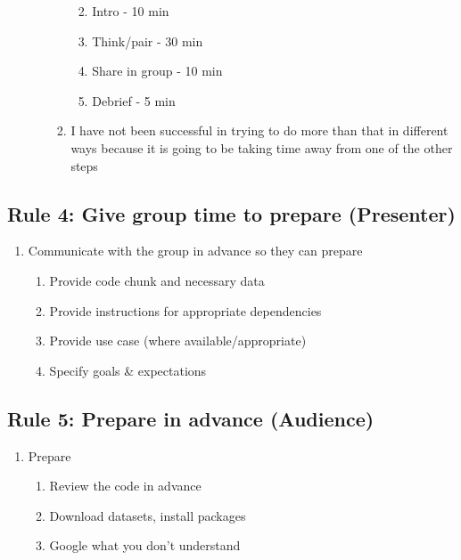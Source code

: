 \documentclass[
  11pt,
]{article}
\providecommand{\tightlist}{%
  \setlength{\itemsep}{0pt}\setlength{\parskip}{0pt}}
\begin{document}
\begin{enumerate}
\begin{enumerate}
\begin{enumerate}
      \begin{enumerate}
      \def\labelenumiv{\arabic{enumiv}.}
      \tightlist
      \item
        Intro - 10 min
      \item
        Think/pair - 30 min
      \item
        Share in group - 10 min
      \item
        Debrief - 5 min
      \end{enumerate}
    \item
      I have not been successful in trying to do more than that in
      different ways because it is going to be taking time away from one
      of the other steps
    \end{enumerate}
  \end{enumerate}
\end{enumerate}

\hypertarget{rule-4-give-group-time-to-prepare-presenter}{%
\subsection{Rule 4: Give group time to prepare
(Presenter)}\label{rule-4-give-group-time-to-prepare-presenter}}

\begin{enumerate}
\def\labelenumi{\arabic{enumi}.}
\setcounter{enumi}{2}
\tightlist
\item
  Communicate with the group in advance so they can prepare

  \begin{enumerate}
  \def\labelenumii{\alph{enumii}.}
  \tightlist
  \item
    Provide code chunk and necessary data
  \item
    Provide instructions for appropriate dependencies
  \item
    Provide use case (where available/appropriate)
  \item
    Specify goals \& expectations
  \end{enumerate}
\end{enumerate}

\hypertarget{rule-5-prepare-in-advance-audience}{%
\subsection{Rule 5: Prepare in advance
(Audience)}\label{rule-5-prepare-in-advance-audience}}

\begin{enumerate}
\def\labelenumi{\arabic{enumi}.}
\tightlist
\item
  Prepare

  \begin{enumerate}
  \def\labelenumii{\alph{enumii}.}
  \tightlist
  \item
    Review the code in advance
  \item
    Download datasets, install packages
  \item
    Google what you don't understand
  \end{enumerate}
\end{enumerate}
\end{document}
